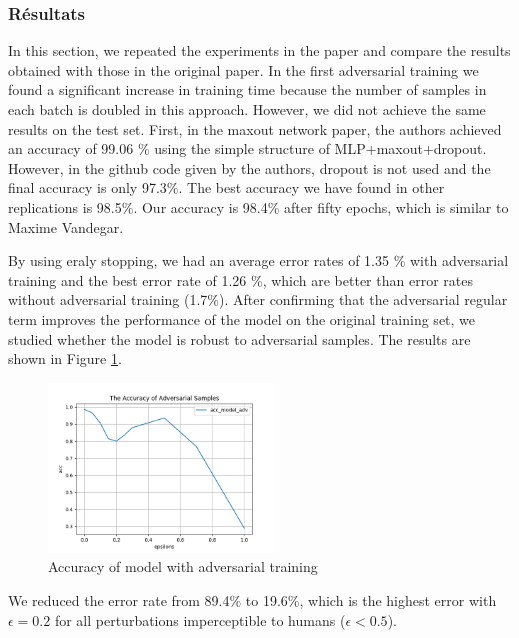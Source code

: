 \subsubsection{Résultats}
In this section, we repeated the experiments in the paper and compare the results obtained with those in the original paper. In the first adversarial training we found a significant increase in training time because the number of samples in each batch is doubled in this approach. However, we did not achieve the same results on the test set. First, in the maxout network paper\citep{pmlr-v28-goodfellow13}, the authors achieved an accuracy of 99.06 $\%$ using the simple structure of MLP+maxout+dropout. However, in the github code given by the authors, dropout is not used and the final accuracy is only 97.3$\%$. The best accuracy we have found in other replications is 98.5$\%$. Our accuracy is 98.4$\%$ after fifty epochs, which is similar to Maxime Vandegar.

By using eraly stopping, we had an average error rates of 1.35 $\%$ with adversarial training and the best error rate of 1.26 $\%$, which are better than error rates without adversarial training (1.7$\%$). After confirming that the adversarial regular term improves the performance of the model on the original training set, we studied whether the model is robust to adversarial samples. The results are shown in Figure \ref{acc_advtraining_2}.

\begin{figure}[htbp]
\centering
\includegraphics[width=6cm]{acc_advtraining_2.png}
\caption{Accuracy of model with adversarial training}
\label{acc_advtraining_2}
\end{figure} 

We reduced the error rate from 89.4$\%$ to 19.6$\%$, which is the highest error with $\epsilon = 0.2$ for all perturbations imperceptible to humans ($\epsilon < 0.5$).
